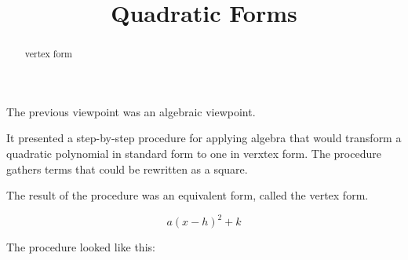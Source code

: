 \documentclass{ximera}
\title{Quadratic Forms}
\begin{document}
\begin{abstract}
vertex form
\end{abstract}
\maketitle






The previous viewpoint was an algebraic viewpoint.  

It presented a step-by-step procedure for applying algebra that would transform a quadratic polynomial in standard form to one in verxtex form.  The procedure gathers terms that could be rewritten as a square.  

The result of the procedure was an equivalent form, called the vertex form. 


\[
a (x - h)^2 + k
\]




The procedure looked like this:
\end{document}

